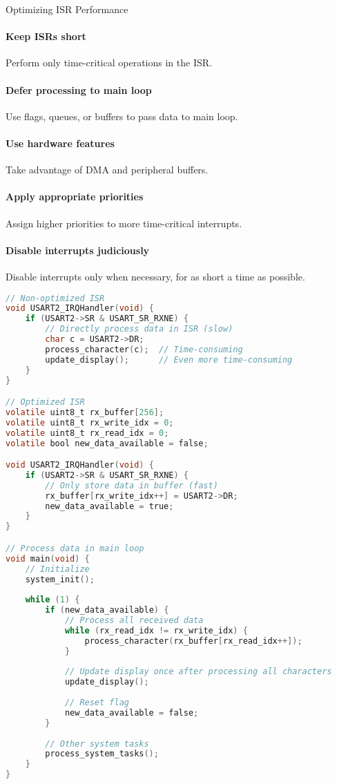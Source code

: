 \begin{KR}{Optimizing ISR Performance}
\paragraph{Keep ISRs short}
Perform only time-critical operations in the ISR.
\paragraph{Defer processing to main loop}
Use flags, queues, or buffers to pass data to main loop.
\paragraph{Use hardware features}
Take advantage of DMA and peripheral buffers.
\paragraph{Apply appropriate priorities}
Assign higher priorities to more time-critical interrupts.
\paragraph{Disable interrupts judiciously}
Disable interrupts only when necessary, for as short a time as possible.

\begin{lstlisting}[language=C, style=basesmol]
// Non-optimized ISR
void USART2_IRQHandler(void) {
    if (USART2->SR & USART_SR_RXNE) {
        // Directly process data in ISR (slow)
        char c = USART2->DR;
        process_character(c);  // Time-consuming
        update_display();      // Even more time-consuming
    }
}

// Optimized ISR
volatile uint8_t rx_buffer[256];
volatile uint8_t rx_write_idx = 0;
volatile uint8_t rx_read_idx = 0;
volatile bool new_data_available = false;

void USART2_IRQHandler(void) {
    if (USART2->SR & USART_SR_RXNE) {
        // Only store data in buffer (fast)
        rx_buffer[rx_write_idx++] = USART2->DR;
        new_data_available = true;
    }
}

// Process data in main loop
void main(void) {
    // Initialize
    system_init();
    
    while (1) {
        if (new_data_available) {
            // Process all received data
            while (rx_read_idx != rx_write_idx) {
                process_character(rx_buffer[rx_read_idx++]);
            }
            
            // Update display once after processing all characters
            update_display();
            
            // Reset flag
            new_data_available = false;
        }
        
        // Other system tasks
        process_system_tasks();
    }
}
\end{lstlisting}
\end{KR}

